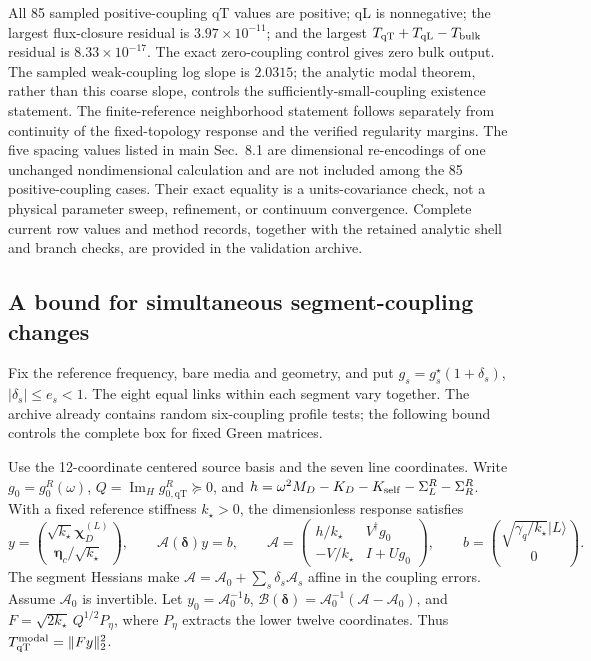 \documentclass[10pt,aps,onecolumn,notitlepage,nofootinbib]{revtex4-2}
\newcommand{\veta}{\bm\eta}
\newcommand{\vchi}{\bm\chi}
\newcommand{\qT}{\mathrm{qT}}
\newcommand{\qL}{\mathrm{qL}}
\newcommand{\ImH}{\operatorname{Im}_{\!H}}
\begin{document}
All 85 sampled positive-coupling qT values are positive; qL is nonnegative; the largest flux-closure residual is $3.97\times10^{-11}$; and the largest $T_{\qT}+T_{\qL}-T_{\rm bulk}$ residual is $8.33\times10^{-17}$. The exact zero-coupling control gives zero bulk output. The sampled weak-coupling log slope is $2.0315$; the analytic modal theorem, rather than this coarse slope, controls the sufficiently-small-coupling existence statement. The finite-reference neighborhood statement follows separately from continuity of the fixed-topology response and the verified regularity margins. The five spacing values listed in main Sec.~8.1 are dimensional re-encodings of one unchanged nondimensional calculation and are not included among the 85 positive-coupling cases. Their exact equality is a units-covariance check, not a physical parameter sweep, refinement, or continuum convergence. Complete current row values and method records, together with the retained analytic shell and branch checks, are provided in the validation archive.

\subsection{A bound for simultaneous segment-coupling changes}
\label{sec:sm-coupling-box}

Fix the reference frequency, bare media and geometry, and put $g_s=g_s^\star(1+\delta_s)$, $|\delta_s|\leq e_s<1$. The eight equal links within each segment vary together. The archive already contains random six-coupling profile tests; the following bound controls the complete box for fixed Green matrices.

Use the 12-coordinate centered source basis and the seven line coordinates. Write $g_0=g_0^R(\omega)$, $Q=\ImH g_{0,\qT}^R\succeq0$, and $h=\omega^2M_D-K_D-K_{\rm self}-\Sigma_L^R-\Sigma_R^R$. With a fixed reference stiffness $k_\star>0$, the dimensionless response satisfies
\begin{equation}
 y=\binom{\sqrt{k_\star}\vchi_D^{(L)}}{\veta_c/\sqrt{k_\star}},\qquad
 \mathcal A(\bm\delta)y=b,\qquad
 \mathcal A=
 \begin{pmatrix}h/k_\star&V^\dagger g_0\\-V/k_\star&I+Ug_0\end{pmatrix},\qquad
 b=\binom{\sqrt{\gamma_q/k_\star}|L\rangle}{0}.
 \label{eq:sm-box-system}
\end{equation}
The segment Hessians make $\mathcal A=\mathcal A_0+\sum_s\delta_s\mathcal A_s$ affine in the coupling errors. Assume $\mathcal A_0$ is invertible. Let $y_0=\mathcal A_0^{-1}b$, $\mathcal B(\bm\delta)=\mathcal A_0^{-1}(\mathcal A-\mathcal A_0)$, and $F=\sqrt{2k_\star}\,Q^{1/2}P_\eta$, where $P_\eta$ extracts the lower twelve coordinates. Thus $T_{\qT}^{\rm modal}=\|Fy\|_2^2$.
\end{document}
